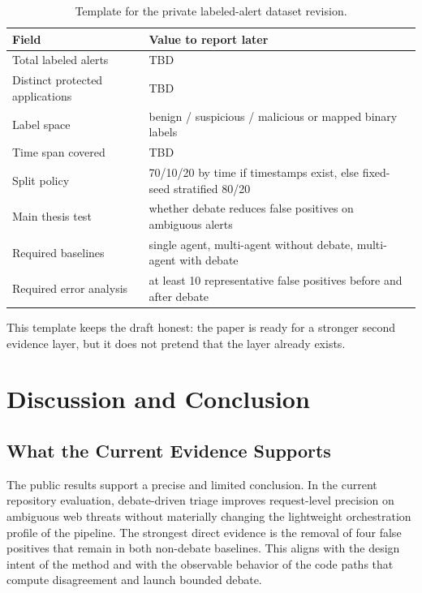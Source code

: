 \documentclass[pdflatex,sn-mathphys-num]{sn-jnl}
\begin{document}
\begin{table}[t]
  \centering
  \caption{Template for the private labeled-alert dataset revision.}
  \label{tab:private-template}
  \footnotesize
  \begin{tabularx}{\columnwidth}{@{}p{}Y@{}}
    \toprule
    Field & Value to report later \\
    \midrule
    Total labeled alerts & TBD \\
    Distinct protected applications & TBD \\
    Label space & benign / suspicious / malicious or mapped binary labels \\
    Time span covered & TBD \\
    Split policy & 70/10/20 by time if timestamps exist, else fixed-seed stratified 80/20 \\
    Main thesis test & whether debate reduces false positives on ambiguous alerts \\
    Required baselines & single agent, multi-agent without debate, multi-agent with debate \\
    Required error analysis & at least 10 representative false positives before and after debate \\
    \bottomrule
  \end{tabularx}
\end{table}

This template keeps the draft honest: the paper is ready for a stronger second evidence layer, but it does not pretend that the layer already exists.
\section{Discussion and Conclusion}\label{sec:discussion}

\subsection{What the Current Evidence Supports}

The public results support a precise and limited conclusion. In the current repository evaluation, debate-driven triage improves request-level precision on ambiguous web threats without materially changing the lightweight orchestration profile of the pipeline. The strongest direct evidence is the removal of four false positives that remain in both non-debate baselines. This aligns with the design intent of the method and with the observable behavior of the code paths that compute disagreement and launch bounded debate.
\end{document}
